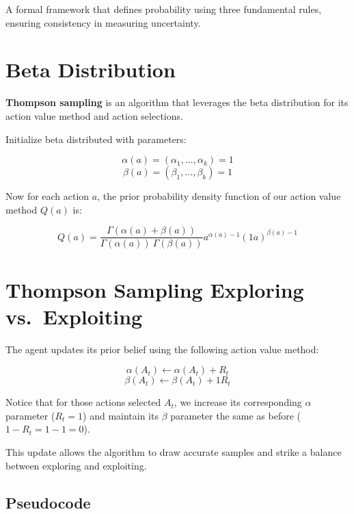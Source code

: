 \documentclass[
  letterpaper,
  DIV=11,
  numbers=noendperiod]{scrreprt}
\begin{document}
\begin{tcolorbox}[enhanced jigsaw, arc=.35mm, toprule=.15mm, leftrule=.75mm, colback=white, left=2mm, colframe=quarto-callout-note-color-frame, rightrule=.15mm, opacityback=0, breakable, bottomrule=.15mm]

A formal framework that defines probability using three fundamental
rules, ensuring consistency in measuring uncertainty. 🎲

\end{tcolorbox}

\section{Beta Distribution}\label{beta-distribution-1}

\textbf{Thompson sampling} is an algorithm that leverages the beta
distribution for its action value method and action selections.

Initialize beta distributed with parameters:

\[
\alpha(a) = (\alpha_{1}, . . . , \alpha_{k}) = 1
\] \[
\beta(a) = (\beta_{1}, . . . , \beta_{k}) = 1
\]

Now for each action \(a\), the prior probability density function of our
action value method \(Q(a)\) is:

\[
  Q(a) = \frac{\Gamma(\alpha(a) + \beta(a))}{\Gamma(\alpha(a)) \ \Gamma(\beta(a))} a^{\alpha(a)-1} (1 a)^{\beta(a)-1}
\]

\section{Thompson Sampling Exploring
vs.~Exploiting}\label{thompson-sampling-exploring-vs.-exploiting}

The agent updates its prior belief using the following action value
method:

\[
\alpha(A_{t}) \gets \alpha(A_{t}) + R_{t}
\] \[
\beta(A_{t}) \gets \beta(A_{t}) + 1 R_{t}
\]

Notice that for those actions selected \(A_t\), we increase its
corresponding \(\alpha\) parameter (\(R_t = 1\)) and maintain its
\(\beta\) parameter the same as before (\(1 - R_t = 1 - 1 = 0\)).

This update allows the algorithm to draw accurate samples and strike a
balance between exploring and exploiting.

\subsection{Pseudocode}\label{pseudocode-2}
\end{document}
